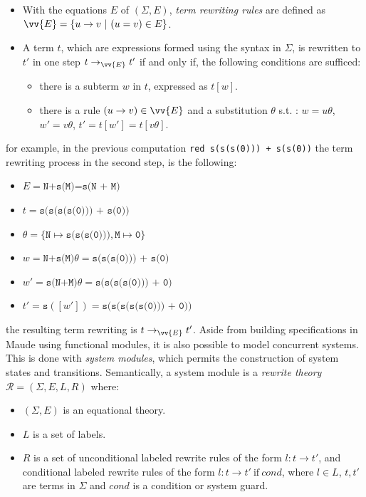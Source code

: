 \begin{itemize}
    \item With the equations $E$ of $(\Sigma, E)$, \textit{term rewriting rules} are defined as $\vv{E} = \{u \rightarrow v  \ | \ (u = v) \in E \}$. 
    \item A term $t$, which are expressions formed using the syntax in $\Sigma$, is rewritten to $t'$ in one step $t \rightarrow_{\vv{E}} t'$ if and only if, the following conditions are sufficed:
        \begin{itemize}
            \item there is a subterm $w$ in $t$, expressed as $t[w]$.
            \item there is a rule $(u \rightarrow v) \in \vv{E}$ and a substitution $\theta$ s.t. : $w = u\theta$, $w' = v\theta$, $t'=t[w']=t[v\theta]$.   
        \end{itemize}
\end{itemize}
for example, in the previous computation \texttt{red s(s(s(0))) + s(s(0))} the term rewriting process in the second step, is the following:
\begin{itemize}
    \item $E = \texttt{N+s(M)=s(N + M)}$
    \item $t = \texttt{s(s(s(s(0))) + s(0))}$
    \item $\theta = \{\texttt{N} \mapsto \texttt{s(s(s(0)))},\texttt{M} \mapsto \texttt{0} \}$
    \item $w = \texttt{N+s(M)}\theta = \texttt{s(s(s(0))) + s(0)}$
    \item $w' = \texttt{s(N+M)}\theta = \texttt{s(s(s(s(0))) + 0)}$
    \item $t' = \texttt{s}([w']) = \texttt{s(s(s(s(s(0))) + 0))}$
\end{itemize}
the resulting term rewriting is $t \rightarrow_{\vv{E}} t'$.
Aside from building specifications in Maude using functional modules, it is also possible to model concurrent systems. This is done with \textit{system modules}, which permits the construction of system states and transitions. Semantically, a system module is a \textit{rewrite theory} \cite{PeterMaude,Lecture3} $\mathscr{R} = (\Sigma, E, L, R)$ where: 
\begin{itemize}
    \item $(\Sigma, E)$ is an equational theory.
    \item $L$ is a set of labels.
    \item $R$ is a set of unconditional labeled rewrite rules of the form $l: t \rightarrow t'$, and conditional labeled rewrite rules of the form $l: t \rightarrow t' \ \text{if} \ cond$, where $l \in L$, $t,t'$ are terms in $\Sigma$ and $cond$ is a condition or system guard.    
\end{itemize}
